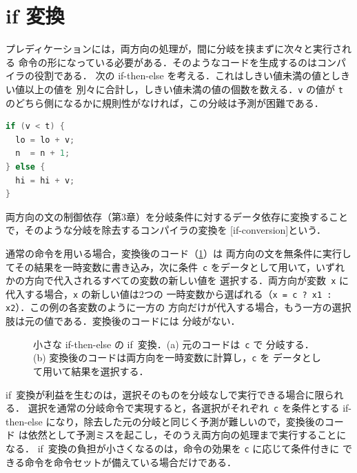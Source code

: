 \documentclass[../main.tex]{subfiles}
\begin{document}
\section{if 変換}
\label{sec:l05-if-conversion}

プレディケーションには，両方向の処理が，間に分岐を挟まずに次々と実行される
命令の形になっている必要がある．そのようなコードを生成するのはコンパイラの役割である．
次の if-then-else を考える．これはしきい値未満の値としきい値以上の値を
別々に合計し，しきい値未満の値の個数を数える．\texttt{v} の値が \texttt{t}
のどちら側になるかに規則性がなければ，この分岐は予測が困難である．
\begin{lstlisting}[language=C, numbers=none]
if (v < t) {
  lo = lo + v;
  n  = n + 1;
} else {
  hi = hi + v;
}
\end{lstlisting}

\begin{definition}[if 変換]
  \label{def:l05-if-conversion}
  両方向の文の制御依存（第3章）を分岐条件に対するデータ依存に変換すること
  で，そのような分岐を除去するコンパイラの変換を
  [if-conversion]という．
\end{definition}

通常の命令を用いる場合，変換後のコード（\cref{fig:l05-if-conversion}）は
両方向の文を無条件に実行してその結果を一時変数に書き込み，次に条件~\texttt{c}
をデータとして用いて，いずれかの方向で代入されるすべての変数の新しい値を
選択する．両方向が変数~\texttt{x} に代入する場合，\texttt{x} の新しい値は2つの
一時変数から選ばれる（\texttt{x = c ? x1 : x2}）．この例の各変数のように一方の
方向だけが代入する場合，もう一方の選択肢は元の値である．変換後のコードには
分岐がない．%

\begin{figure}[htbp]
  \centering
  
  \caption{小さな if-then-else の if~変換．(a) 元のコードは~\texttt{c} で
    分岐する．(b) 変換後のコードは両方向を一時変数に計算し，\texttt{c} を
    データとして用いて結果を選択する．}
  \label{fig:l05-if-conversion}
\end{figure}

if~変換が利益を生むのは，選択そのものを分岐なしで実行できる場合に限られる．%
選択を通常の分岐命令で実現すると，各選択がそれぞれ~\texttt{c} を条件とする
if-then-else になり，除去した元の分岐と同じく予測が難しいので，変換後のコード
は依然として予測ミスを起こし，そのうえ両方向の処理まで実行することになる．
if~変換の負担が小さくなるのは，命令の効果を \texttt{c} に応じて条件付きに
できる命令を命令セットが備えている場合だけである．
\end{document}

